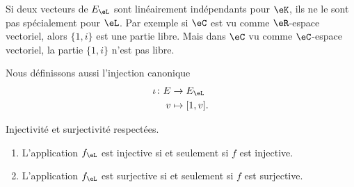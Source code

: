 \begin{remark}
    Si deux vecteurs de \( E_{\eL}\) sont linéairement indépendants pour \( \eK\), ils ne le sont pas spécialement pour \( \eL\). Par exemple si \( \eC\) est vu comme \( \eR\)-espace vectoriel, alors \( \{ 1,i \}\) est une partie libre. Mais dans \( \eC\) vu comme \( \eC\)-espace vectoriel, la partie \( \{ 1,i \}\) n'est pas libre.
\end{remark}

Nous définissons aussi l'injection canonique
\begin{equation}
    \begin{aligned}
        \iota\colon E&\to E_{\eL} \\
        v&\mapsto [1,v].
    \end{aligned}
\end{equation}

\begin{proposition}      \label{PropooWECLooHPzIHw}
    Injectivité et surjectivité respectées.
    \begin{enumerate}
        \item
            L'application \( f_{\eL}\) est injective si et seulement si \( f\) est injective.
        \item
            L'application \( f_{\eL}\) est surjective si et seulement si \( f\) est surjective.
    \end{enumerate}
\end{proposition}

